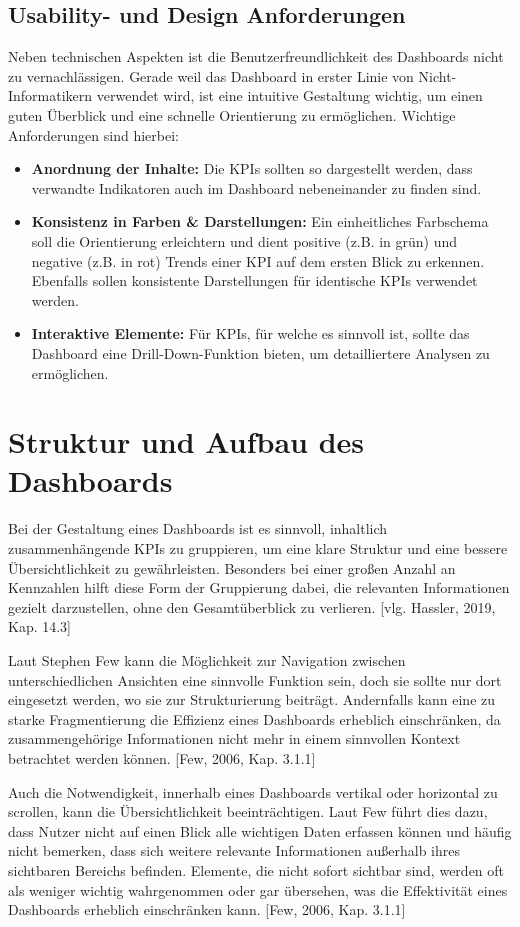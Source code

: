 \subsection{Usability- und Design Anforderungen}
Neben technischen Aspekten ist die Benutzerfreundlichkeit des Dashboards nicht zu vernachlässigen. Gerade weil das Dashboard in erster Linie von Nicht-Informatikern verwendet wird, ist eine intuitive Gestaltung wichtig, um einen guten Überblick und eine schnelle Orientierung zu ermöglichen. Wichtige Anforderungen sind hierbei: 
\begin{itemize}
    \item \textbf{Anordnung der Inhalte:} Die KPIs sollten so dargestellt werden, dass verwandte Indikatoren auch im Dashboard nebeneinander zu finden sind.
    \item \textbf{Konsistenz in Farben \& Darstellungen:} Ein einheitliches Farbschema soll die Orientierung erleichtern und dient positive (z.B. in grün) und negative (z.B. in rot) Trends einer KPI auf dem ersten Blick zu erkennen. Ebenfalls sollen konsistente Darstellungen für identische KPIs verwendet werden.
    \item \textbf{Interaktive Elemente:} Für KPIs, für welche es sinnvoll ist, sollte das Dashboard eine Drill-Down-Funktion bieten, um detailliertere Analysen zu ermöglichen.
\end{itemize}

\section{Struktur und Aufbau des Dashboards}
Bei der Gestaltung eines Dashboards ist es sinnvoll, inhaltlich zusammenhängende KPIs zu gruppieren, um eine klare Struktur und eine bessere Übersichtlichkeit zu gewährleisten. Besonders bei einer großen Anzahl an Kennzahlen hilft diese Form der Gruppierung dabei, die relevanten Informationen gezielt darzustellen, ohne den Gesamtüberblick zu verlieren. [vlg. Hassler, 2019, Kap. 14.3]

Laut Stephen Few kann die Möglichkeit zur Navigation zwischen unterschiedlichen Ansichten eine sinnvolle Funktion sein, doch sie sollte nur dort eingesetzt werden, wo sie zur Strukturierung beiträgt. Andernfalls kann eine zu starke Fragmentierung die Effizienz eines Dashboards erheblich einschränken, da zusammengehörige Informationen nicht mehr in einem sinnvollen Kontext betrachtet werden können. [Few, 2006, Kap. 3.1.1]

Auch die Notwendigkeit, innerhalb eines Dashboards vertikal oder horizontal zu scrollen, kann die Übersichtlichkeit beeinträchtigen. Laut Few führt dies dazu, dass Nutzer nicht auf einen Blick alle wichtigen Daten erfassen können und häufig nicht bemerken, dass sich weitere relevante Informationen außerhalb ihres sichtbaren Bereichs befinden. Elemente, die nicht sofort sichtbar sind, werden oft als weniger wichtig wahrgenommen oder gar übersehen, was die Effektivität eines Dashboards erheblich einschränken kann. [Few, 2006, Kap. 3.1.1]

